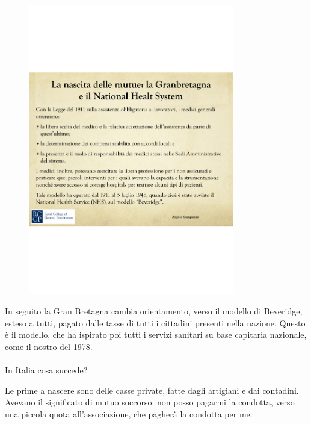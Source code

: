 \begin{figure}[!ht]
\centering
	\includegraphics[width=0.8\textwidth]{38/image4.png}
	\end{figure}
	
In seguito la Gran Bretagna cambia orientamento, verso il modello di
Beveridge, esteso a tutti, pagato dalle tasse di tutti i cittadini
presenti nella nazione. Questo è il modello, che ha ispirato poi tutti i
servizi sanitari su base capitaria nazionale, come il nostro del 1978.
\\\\
In Italia cosa succede?

Le prime a nascere sono delle casse private, fatte dagli artigiani e dai
contadini. Avevano il significato di mutuo soccorso: non posso pagarmi
la condotta, verso una piccola quota all'associazione, che pagherà la
condotta per me.


